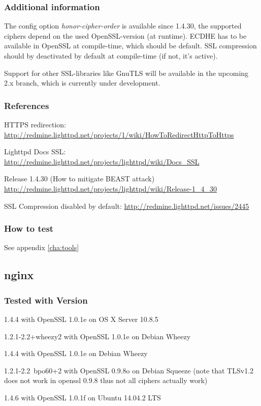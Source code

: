 
\subsubsection{Additional information}
The config option \emph{honor-cipher-order} is available since 1.4.30, the
supported ciphers depend on the used OpenSSL-version (at runtime). ECDHE has to
be available in OpenSSL at compile-time, which should be default. SSL
compression should by deactivated by default at compile-time (if not, it's
active).

Support for other SSL-libraries like GnuTLS will be available in the upcoming
2.x branch, which is currently under development.


\subsubsection{References}
\begin{itemize*}
  \item HTTPS redirection: \url{http://redmine.lighttpd.net/projects/1/wiki/HowToRedirectHttpToHttps}
  \item Lighttpd Docs SSL: \url{http://redmine.lighttpd.net/projects/lighttpd/wiki/Docs\_SSL}
  \item Release 1.4.30 (How to mitigate BEAST attack) \url{http://redmine.lighttpd.net/projects/lighttpd/wiki/Release-1\_4\_30}
  \item SSL Compression disabled by default: \url{http://redmine.lighttpd.net/issues/2445}
\end{itemize*}


\subsubsection{How to test}
See appendix \ref{cha:tools}


\subsection{nginx}

\subsubsection{Tested with Version}
\begin{itemize*}
  \item 1.4.4 with OpenSSL 1.0.1e on OS X Server 10.8.5
  \item 1.2.1-2.2+wheezy2 with OpenSSL 1.0.1e on Debian Wheezy
  \item 1.4.4 with OpenSSL 1.0.1e on Debian Wheezy
  \item 1.2.1-2.2~bpo60+2 with OpenSSL 0.9.8o on Debian Squeeze (note that TLSv1.2 does not work in openssl 0.9.8 thus not all ciphers actually work)
  \item 1.4.6 with OpenSSL 1.0.1f on Ubuntu 14.04.2 LTS
\end{itemize*}


